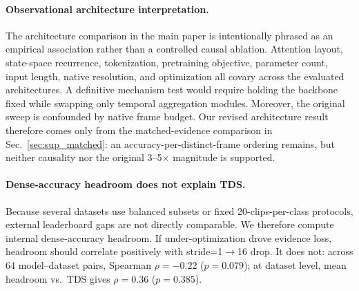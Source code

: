\documentclass[runningheads]{llncs}
\newcommand{\TDS}{\textsc{TDS}}
\newcommand{\rev}[1]{\textcolor{revblue}{#1}}
\newcommand{\revdel}[1]{}
\begin{document}
\paragraph{Observational architecture interpretation.}
The architecture comparison in the main paper is intentionally phrased as an empirical association rather than a controlled causal ablation. Attention layout, state-space recurrence, tokenization, pretraining objective, parameter count, input length, native resolution, and optimization all covary across the evaluated architectures. A definitive mechanism test would require holding the backbone fixed while swapping only temporal aggregation modules. \revdel{Our contribution is the large controlled sampling sweep showing that, within this architecture pool, models with global divided attention or recurrent state integration are consistently less sensitive to temporal subsampling than CNNs and factorized-attention Transformers.}\rev{Moreover, the original sweep is confounded by native frame budget. Our revised architecture result therefore comes only from the matched-evidence comparison in Sec.~\ref{sec:sup_matched}: an accuracy-per-distinct-frame ordering remains, but neither causality nor the original 3--5$\times$ magnitude is supported.}

\paragraph{Dense-accuracy headroom does not explain \TDS{}.}
Because several datasets use balanced subsets or fixed 20-clips-per-class protocols, external leaderboard gaps are not directly comparable. We therefore compute internal dense-accuracy headroom. If under-optimization drove \rev{evidence loss}\revdel{aliasing loss}, headroom should correlate positively with stride=1$\to$16 drop. It does not: across 64 model--dataset pairs, Spearman $\rho=-0.22$ ($p=0.079$); at dataset level, mean headroom vs.\ \TDS{} gives $\rho=0.36$ ($p=0.385$).
\end{document}
